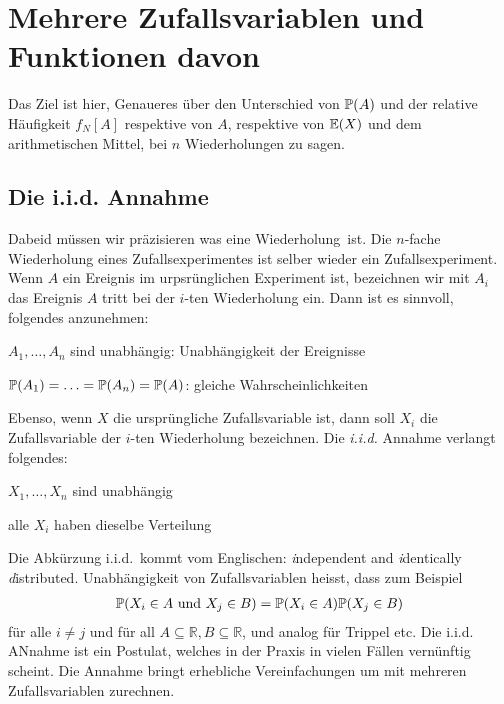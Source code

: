 \chapter{Mehrere Zufallsvariablen und Funktionen davon}
\label{kap4}
Das Ziel ist hier, Genaueres über den Unterschied von $\mathbb P(A)$ und der relative Häufigkeit $f_N[A]$ respektive von $A$, respektive von $\operatorname{\mathbb E}(X)$ und dem arithmetischen Mittel, bei $n$ Wiederholungen zu sagen.
\section{Die i.i.d. Annahme}
Dabeid müssen wir präzisieren was eine \glqq Wiederholung\grqq\ ist. Die $n$-fache Wiederholung eines Zufallsexperimentes ist selber wieder ein Zufallsexperiment. Wenn $A$ ein Ereignis im urpsrünglichen Experiment ist, bezeichnen wir mit $A_i$ das Ereignis \glqq $A$ tritt bei der $i$-ten Wiederholung ein\grqq. Dann ist es sinnvoll, folgendes anzunehmen:
\begin{compactitem}
	\item $A_1,\ldots,A_n$ sind unabhängig: Unabhängigkeit der Ereignisse
	\item $\mathbb P(A_1)=\ldots = \mathbb P(A_n)=\mathbb P(A)$: gleiche Wahrscheinlichkeiten\\
\end{compactitem}
Ebenso, wenn $X$ die ursprüngliche Zufallsvariable ist, dann soll $X_i$ die Zufallsvariable der $i$-ten Wiederholung bezeichnen. Die \emph{i.i.d.} Annahme verlangt folgendes:
\begin{compactitem}
	\item $X_1,\ldots,X_n$ sind unabhängig
	\item alle $X_i$ haben dieselbe Verteilung
\end{compactitem}
Die Abkürzung \glqq i.i.d.\grqq\ kommt vom Englischen: \emph{i}ndependent and \emph{i}dentically \emph{d}istributed. Unabhängigkeit von Zufallsvariablen heisst, dass zum Beispiel
\begin{gather*}
	\mathbb P(X_i\in A\text{ und }X_j\in B)= \mathbb P(X_i\in A)\mathbb P(X_j\in B)
\end{gather*}
für alle $i\neq j$ und für all $A\subseteq \mathbb{R}, B\subseteq \mathbb{R}$, und analog für Trippel etc. Die i.i.d. ANnahme ist ein \glqq Postulat\grqq, welches in der Praxis in vielen Fällen vernünftig scheint. Die Annahme bringt erhebliche Vereinfachungen um mit mehreren Zufallsvariablen zurechnen.
